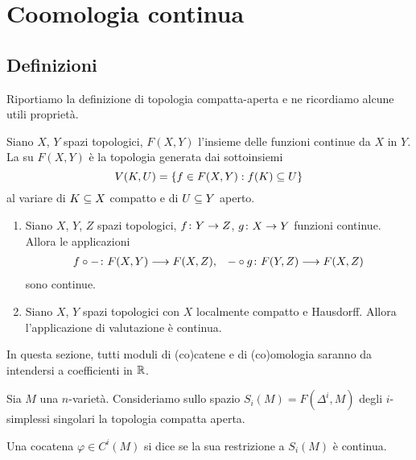 \section{Coomologia continua}

\subsection{Definizioni}

Riportiamo la definizione di topologia compatta-aperta e ne ricordiamo alcune utili proprietà.

\begin{definition}
Siano $X$, $Y$ spazi topologici, $F(X,Y)$ l'insieme delle funzioni continue da $X$ in $Y$. La  su $F(X,Y)$ è la topologia generata dai sottoinsiemi
\[
V(K,U)=\{f\in F(X,Y): f(K)\subseteq U\}
\]
al variare di $K\subseteq X$ compatto e di $U\subseteq Y$ aperto.
\end{definition}

\begin{lemma}
\begin{enumerate}
\item Siano $X$, $Y$, $Z$ spazi topologici, $\map{f}{Y}{Z}$, $\map{g}{X}{Y}$ funzioni continue. Allora le applicazioni
\begin{align*}
\map{f\circ{-}}{F(X,Y)}{F(X,Z)},&&\map{{-}\circ g}{F(Y,Z)}{F(X,Z)}
\end{align*}
sono continue.
\item Siano $X$, $Y$ spazi topologici con $X$ localmente compatto e Hausdorff. Allora l'applicazione di valutazione
è continua.
\end{enumerate}
\end{lemma}

In questa sezione, tutti moduli di (co)catene e di (co)omologia saranno da intendersi a coefficienti in $\mathbb{R}$. 

Sia $M$ una $n$-varietà. Consideriamo sullo spazio $S_i(M)=F(\Delta^i,M)$ degli $i$-simplessi singolari la topologia compatta aperta.

\begin{definition}
Una cocatena $\varphi\in C^i(M)$ si dice  se la sua restrizione a $S_i(M)$ è continua.
\end{definition}

